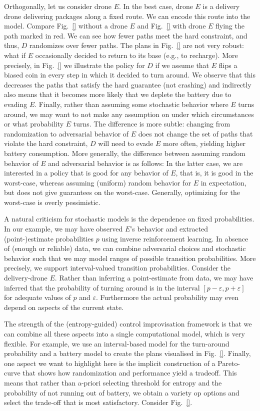 Orthogonally, let us consider drone $E$. 
In the best case, drone $E$ is a delivery drone delivering packages along a fixed route. We can encode this route into the model. 
Compare Fig.~\ref{} without a drone $E$ and Fig.~\ref{} with drone $E$ flying the path marked in red. 
We can see how fewer paths meet the hard constraint, and thus, $D$ randomizes over fewer paths. 
The plans in Fig.~\ref{} are not very robust: what if $E$ occasionally decided to return to its base (e.g., to recharge). More precisely, in Fig.~\ref{} we illustrate the policy for $D$ if we assume that $E$ flips a biased coin in every step in which it decided to turn around.
We observe that this decreases the paths that satisfy the hard guarantee (not crashing) and indirectly also means that it becomes more likely that we deplete the battery due to evading $E$.
Finally, rather than assuming some stochastic behavior where $E$ turns around, we may want to not make any assumption on under which circumstances or what probability $E$ turns. 
The difference is more subtle: changing from randomization to adversarial behavior of $E$ does not change the set of paths that violate the hard constraint, $D$ will need to evade $E$ more often, yielding higher battery consumption. 
More generally, the difference between assuming random behavior of $E$ and adversarial behavior is as follows: In the latter case, we are interested in a policy that is good for any behavior of $E$, that is, it is good in the worst-case, whereas assuming (uniform) random behavior for $E$ in expectation, but does not give guarantees on the worst-case. Generally, optimizing for the worst-case is overly pessimistic.

A natural criticism for stochastic models is the dependence on fixed probabilities.
 In our example, we may have observed $E$'s behavior and extracted (point-)estimate probabilities $p$ using inverse reinforcement learning. In absence of (enough or reliable) data, we can combine adversarial choices and stochastic behavior such that we may model ranges of possible transition probabilities. 
 More precisely, we support interval-valued transition probabilities. Consider the delivery-drone $E$. Rather than inferring a point-estimate from data, we may have inferred that the probability of turning around is in the interval $[p - \varepsilon, p + \varepsilon]$ for adequate values of $p$ and $\varepsilon$.  Furthermore the actual probability may even depend on aspects of the current state. 

The strength of the (entropy-guided) control improvisation framework is that we can combine all these aspects into a single computational model, which is very flexible. For example, we use an interval-based model for the turn-around probability and a battery model to create the plans visualised in Fig.~\ref{}.
Finally, one aspect we want to highlight here is the implicit construction of a Pareto-curve that shows how randomization and performance yield a tradeoff. This means that rather than a-priori selecting threshold for entropy and the probability of not running out of battery, we obtain a variety op options and select the trade-off that is most satisfactory. Consider Fig.~\ref{}.


